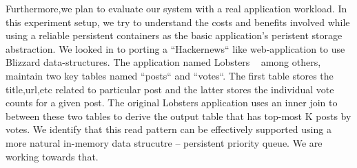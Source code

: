 Furthermore,we plan to evaluate our system with a real application workload. In this experiment setup, we try to understand the costs
and benefits involved while using a reliable persistent containers as the basic application's peristent storage abstraction.
We looked in to porting a ``Hackernews`` like web-application to use Blizzard data-structures. The application named Lobsters
~\cite{lobsters} among others, maintain two key tables named ``posts`` and ``votes``. The first table stores the 
title,url,etc related to particular post and the latter stores the individual vote counts for a given post. The original
Lobsters application uses an inner join to between these two tables to derive the output table that has top-most K posts
by votes. We identify that this read pattern can be effectively supported using a more natural in-memory data strucutre --
persistent priority queue. We are working towards that.


